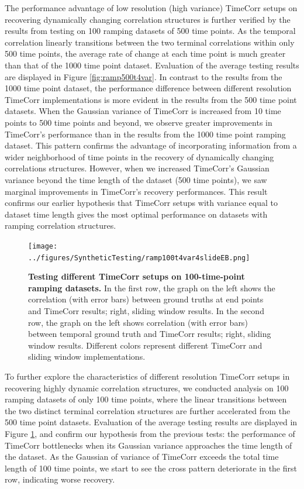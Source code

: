 \documentclass[11pt]{article}
\begin{document}
The performance advantage of low resolution (high variance) TimeCorr setups on recovering dynamically changing correlation structures is further verified by the results from testing on 100 ramping datasets of 500 time points. As the temporal correlation linearly transitions between the two terminal correlations within only 500 time points, the average rate of change at each time point is much greater than that of the 1000 time point dataset. Evaluation of the average testing results are displayed in Figure \ref{fig:ramp500t4var}. In contrast to the results from the 1000 time point dataset, the performance difference between different resolution TimeCorr implementations is more evident in the results from the 500 time point datasets. When the Gaussian variance of TimeCorr is increased from 10 time points to 500 time points and beyond, we observe greater improvements in TimeCorr's performance than in the results from the 1000 time point ramping dataset. This pattern confirms the advantage of incorporating information from a wider neighborhood of time points in the recovery of dynamically changing correlations structures. However, when we increased TimeCorr's Gaussian variance beyond the time length of the dataset (500 time points), we saw marginal improvements in TimeCorr's recovery performances. This result confirms our earlier hypothesis that TimeCorr setups with variance equal to dataset time length gives the most optimal performance on datasets with ramping correlation structures.


\begin{figure}[!htb]
\texttt{[image: ../figures/SyntheticTesting/ramp100t4var4slideEB.png]}
\caption{\textbf{Testing different TimeCorr setups on 100-time-point ramping datasets.} In the first row, the graph on the left shows the correlation (with error bars) between ground truths at end points and TimeCorr results; right, sliding window results. In the second row, the graph on the left shows correlation (with error bars) between temporal ground truth and TimeCorr results; right, sliding window results. Different colors represent different TimeCorr and sliding window implementations.}
\label{fig:ramp100t4var}
\end{figure}

To further explore the characteristics of different resolution TimeCorr setups in recovering highly dynamic correlation structures, we conducted analysis on 100 ramping datasets of only 100 time points, where the linear transitions between the two distinct terminal correlation structures are further accelerated from the 500 time point datasets. Evaluation of the average testing results are displayed in Figure \ref{fig:ramp100t4var}, and confirm our hypothesis from the previous tests: the performance of TimeCorr bottlenecks when its Gaussian variance approaches the time length of the dataset. As the Gaussian of variance of TimeCorr exceeds the total time length of 100 time points, we start to see the cross pattern deteriorate in the first row, indicating worse recovery.
\end{document}
